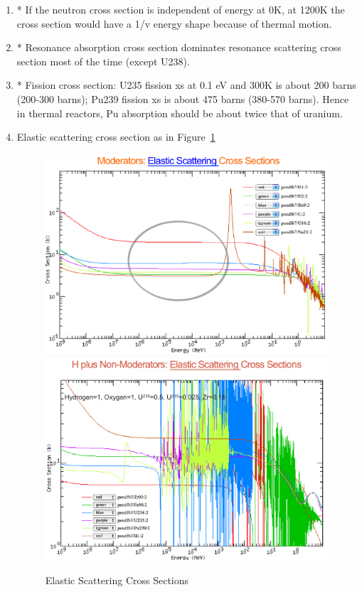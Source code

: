 \documentclass{school-22.211-notes}
\begin{document}
\begin{enumerate}
\item* If the neutron cross section is independent of energy at 0K, at 1200K the cross section would have a 1/v energy shape because of thermal motion. 
  
\item* Resonance absorption cross section dominates resonance scattering cross section most of the time (except U238). 

\item* Fission cross section: U235 fission xs at 0.1 eV and 300K is about 200 barns (200-300 barns); Pu239 fission xs is about 475 barns (380-570 barns). Hence in thermal reactors, Pu absorption should be about twice that of uranium. 

\item Elastic scattering cross section as in Figure~\ref{scatter-xs}
\begin{figure}
  \centering
  \includegraphics[width=6in]{images/intro/scatter-xs-moderator.png}
  \\
  \includegraphics[width=6in]{images/intro/scatter-xs-LWR.png}
  \caption{Elastic Scattering Cross Sections} \label{scatter-xs}
\end{figure}


\end{enumerate}
\end{document}
